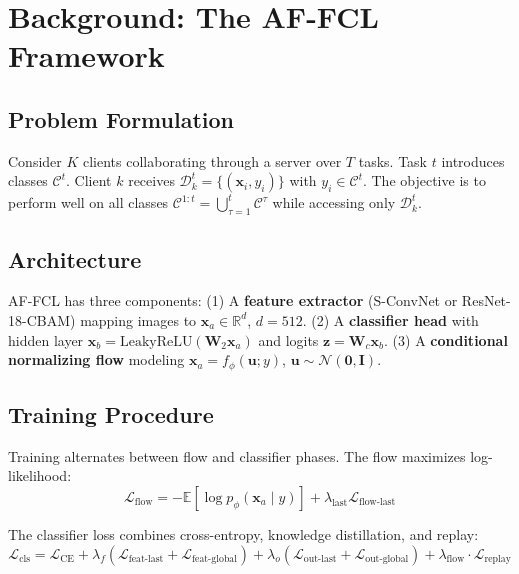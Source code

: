 \documentclass[conference]{IEEEtran}
\begin{document}
\section{Background: The AF-FCL Framework}

\subsection{Problem Formulation}
Consider $K$ clients collaborating through a server over $T$ tasks. Task $t$ introduces classes $\mathcal{C}^t$. Client $k$ receives $\mathcal{D}_k^t = \{(\mathbf{x}_i, y_i)\}$ with $y_i \in \mathcal{C}^t$. The objective is to perform well on all classes $\mathcal{C}^{1:t} = \bigcup_{\tau=1}^{t} \mathcal{C}^\tau$ while accessing only $\mathcal{D}_k^t$.

\subsection{Architecture}
AF-FCL has three components: (1) A \textbf{feature extractor} (S-ConvNet or ResNet-18-CBAM) mapping images to $\mathbf{x}_a \in \mathbb{R}^d$, $d{=}512$. (2) A \textbf{classifier head} with hidden layer $\mathbf{x}_b = \text{LeakyReLU}(\mathbf{W}_2 \mathbf{x}_a)$ and logits $\mathbf{z} = \mathbf{W}_c \mathbf{x}_b$. (3) A \textbf{conditional normalizing flow} modeling $\mathbf{x}_a = f_\phi(\mathbf{u}; y)$, $\mathbf{u} \sim \mathcal{N}(\mathbf{0}, \mathbf{I})$.

\subsection{Training Procedure}
Training alternates between flow and classifier phases. The flow maximizes log-likelihood:
\begin{equation}
\mathcal{L}_{\text{flow}} = -\mathbb{E}\!\left[\log p_\phi(\mathbf{x}_a \mid y)\right] + \lambda_{\text{last}} \mathcal{L}_{\text{flow-last}}
\end{equation}

The classifier loss combines cross-entropy, knowledge distillation, and replay:
\begin{equation}
\mathcal{L}_{\text{cls}} = \mathcal{L}_{\text{CE}} + \lambda_f(\mathcal{L}_{\text{feat-last}} + \mathcal{L}_{\text{feat-global}}) + \lambda_o(\mathcal{L}_{\text{out-last}} + \mathcal{L}_{\text{out-global}}) + \lambda_{\text{flow}} \cdot \mathcal{L}_{\text{replay}}
\end{equation}
\end{document}

